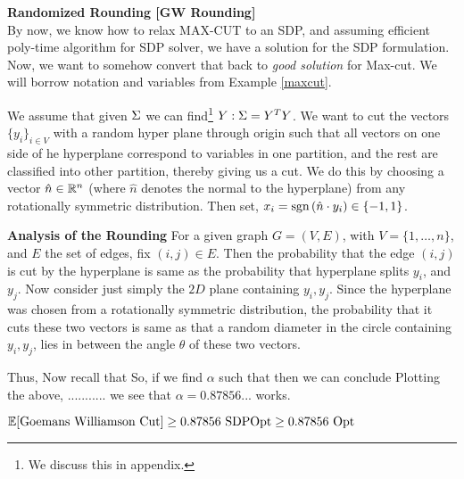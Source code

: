 \begin{example}{\bf Randomized Rounding [GW Rounding]}\\
By now, we know how to relax MAX-CUT to an SDP, and assuming efficient poly-time algorithm for SDP solver, we have a solution for the SDP formulation. Now, we want to somehow convert that back to \textit{good solution} for Max-cut. 
We will borrow notation and variables from Example \ref{maxcut}.

We assume that given $\Sigma$ we can find\footnote{We discuss this in appendix.} $Y : \Sigma = Y^T Y$. 
We want to cut the vectors $\{y_i\}_{i \in V}$ with a random hyper plane through origin such that all vectors on one side of he hyperplane correspond to variables in one partition, and the rest are classified into other partition, thereby giving us a cut. 
We do this by choosing a vector $\hat{n} \in \mathbb{R}^n$ (where $\hat{n}$ denotes the normal to the hyperplane) from any rotationally symmetric distribution. Then set, $x_i = \mbox{sgn}\left(\hat{n} \cdot y_i\right) \in \{-1, 1 \}$.

{\bf Analysis of the Rounding} 
For a given graph $G = (V, E)$, with $V =\{1, \ldots, n\}$, and $E$ the set of edges, fix $(i, j) \in E$. Then the probability that the edge $(i, j)$ is cut by the hyperplane is same as the probability that hyperplane splits $y_i$, and $y_j$. 
Now consider just simply the $2D$ plane containing $y_i, y_j$. Since the hyperplane was chosen from a rotationally symmetric distribution, the probability that it cuts these two vectors is same as that a random diameter in the circle containing $y_i, y_j$, lies in between the angle $\theta$ of these two vectors.

Thus, 
Now recall that 
So, if we find $\alpha$ such that 
then we can conclude 
Plotting the above, ...........
we see that $\alpha = 0.87856...$ works.
\begin{remark}
$\mathbb{E}[\mbox{Goemans Williamson Cut}]  \geq 0.87856 \mbox{\ SDPOpt} \geq 0.87856 \mbox{\ Opt }$
\end{remark} 
\end{example}
 
